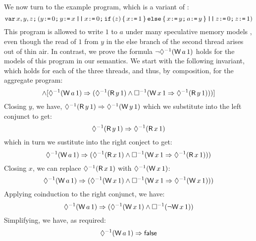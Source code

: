 We now turn to the example program, which is a variant of \cite[Figure 8]{DBLP:journals/toplas/Lochbihler13}:
\[
  \texttt{var}\, x,y,z\texttt{;}\, (
    y\texttt{:=}\,0\texttt{;}\, y\texttt{:=}\, x
  \,\texttt{||}\,
    x\texttt{:=}\,0\texttt{;}\, \texttt{if}\,(z)\,\{\, x\texttt{:=}\,1 \,\}\,\texttt{else}\,\{\, x\texttt{:=}\, y\texttt{;}\, a\texttt{:=}\, y \,\}
  \,\texttt{||}\,
    z\texttt{:=}\,0\texttt{;}\, z\texttt{:=}\,1
  )
\]
This program is allowed to write $1$ to $a$ under many speculative
memory models
\cite{Manson:2005:JMM:1047659.1040336,DBLP:conf/esop/JagadeesanPR10,DBLP:conf/popl/KangHLVD17},
even though the read of $1$ from $y$ in the else branch of the second
thread arises out of thin air.   In contrast, we prove the formula
\begin{math}
  \lnot\once(\DW{a}{1})
\end{math}
holds for the models of this program in our semantics.  We start with the following invariant,
which holds for each of the three threads, and thus, by composition, for the
aggregate program:
\begin{displaymath}
  [\once(\DW{y}{1}) \Rightarrow \once(\DR{x}{1})]
  \land
  [\once(\DW{a}{1}) \Rightarrow (\once(\DR{y}{1}) \land \always(\DW{x}{1} \Rightarrow \once(\DR{y}{1})))]
\end{displaymath}
Closing $y$, we have,
\begin{math}
  \once(\DR{y}{1}) \Rightarrow \once(\DW{y}{1}) %
\end{math}
which we substitute into the left conjunct to get:
\begin{displaymath}
  \once(\DR{y}{1}) \Rightarrow \once(\DR{x}{1})
\end{displaymath}
which in turn we sustitute into the right conject to get:
\begin{displaymath}
  \once(\DW{a}{1}) \Rightarrow (\once(\DR{x}{1}) \land \always(\DW{x}{1} \Rightarrow \once(\DR{x}{1})))
\end{displaymath}
Closing $x$, we can replace $\once(\DR{x}{1})$ with $\once(\DW{x}{1})$:
\begin{displaymath}
  \once(\DW{a}{1}) \Rightarrow (\once(\DW{x}{1}) \land \always(\DW{x}{1} \Rightarrow \once(\DW{x}{1})))
\end{displaymath}
Applying coinduction to the right conjunct, we have:
\begin{displaymath}
  \once(\DW{a}{1}) \Rightarrow (\once(\DW{x}{1}) \land \always(\lnot \DW{x}{1}))
\end{displaymath}
Simplifying, we have, as required:  
\begin{displaymath}
  \once(\DW{a}{1}) \Rightarrow \FALSE
\end{displaymath}

